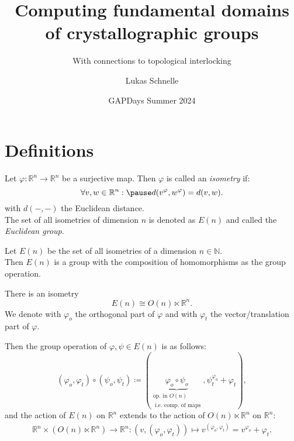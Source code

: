 \documentclass{beamer}
\title{Computing fundamental domains of crystallographic groups}
\subtitle{With connections to topological interlocking}
\author{Lukas Schnelle}
\date{GAPDays Summer 2024}
\theoremstyle{plain}
\newcommand\R{\mathbb R}
\newcommand\N{\mathbb N}
\renewcommand{\phi}{\varphi}
\begin{document}
\frame[plain]{\titlepage}

\section{Definitions}

\begin{frame}
    \begin{definition}\label{def:isometry}
        Let $\phi:\R^n \to \R^n$ be a surjective map. 
        Then $\phi$ is called an \emph{isometry} if: \pause
        $$
            \forall v, w \in \R^n : \pause d(v^\phi, w^\phi) = d(v,w).
        $$
        with $d(-,-)$ the Euclidean distance.\\ \pause 
        The set of all isometries of dimension $n$ is denoted as $E(n)$ and called the \emph{Euclidean group}.
    \end{definition}

    \begin{lemma}\label{lma:isom-is-grp}
        Let $E(n)$ be the set of all isometries of a dimension $n \in \N$. \\ \pause
        Then $E(n)$ is a group with the composition of homomorphisms as the group operation.
    \end{lemma}
\end{frame}

\begin{frame}
    \begin{proposition}
        There is an isometry
        $$
            E(n) \cong O(n) \ltimes \R^n.
        $$
        We denote with $\phi_o$ the orthogonal part of $\phi$ and with $\phi_t$ the vector/translation part of $\phi$.
    \end{proposition}

    Then the group operation of $\phi, \psi \in E(n)$ is as follows:\pause
    $$
        (\phi_o, \phi_t) \circ (\psi_o, \psi_t) \coloneqq (\underbrace{\phi_o \circ \psi_o}_{\substack{\text{op. in }O(n)\\ \text{ i.e. comp. of maps}}}, \psi_t^{\phi_o} + \phi_t),
    $$\pause
    and the action of $E(n)$ on $\R^n$ extends to the action of $O(n) \ltimes \R^n$ on $\R^n$:\pause
    \begin{align*} \label{align:semidirect-action}
        \R^n \times ( O(n) \ltimes \R^n) \to \R^n: (v, (\phi_o, \phi_t)) \mapsto v^{(\phi_o, \phi_t)} = v^{\phi_o} + \phi_t.
    \end{align*}
\end{frame}
\end{document}
